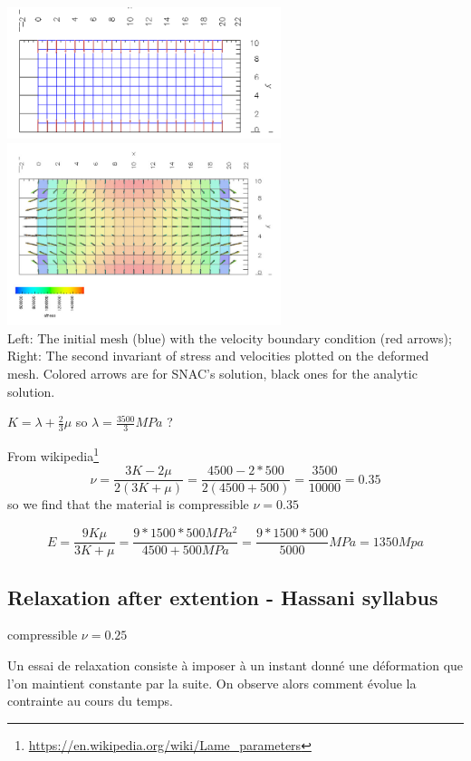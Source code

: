 \begin{center}
\includegraphics[width=8cm]{images/viscoelasticity/snac_5}
\includegraphics[width=8cm]{images/viscoelasticity/snac_6}\\
{\captionfont 
Left: The initial mesh (blue) with the velocity boundary condition (red arrows);
Right: The second invariant of stress and velocities plotted on the deformed mesh. Colored arrows are
for SNAC’s solution, black ones for the analytic solution.}
\end{center}

$K=\lambda + \frac23 \mu$ so $\lambda=\frac{3500}{3}MPa$ ?

From wikipedia\footnote{\url{https://en.wikipedia.org/wiki/Lame_parameters}}
\[
\nu = \frac{3K-2\mu}{2(3K+\mu)} 
= \frac{4500-2*500}{2(4500+500)}
= \frac{3500}{10000}
= 0.35
\]
so we find that the material is {\color{orange} compressible $\nu=0.35$}

\[
E=\frac{9K\mu}{3K+\mu} 
=\frac{9*1500*500 MPa^2}{4500+500 MPa}
=\frac{9*1500*500}{5000} MPa
= 1350Mpa
\]


\subsection{Relaxation after extention - Hassani syllabus}


{\color{orange} compressible $\nu=0.25$}

Un essai de relaxation consiste à imposer à un instant donné une déformation que 
l’on maintient constante par la suite. On observe alors comment évolue la contrainte au cours du temps.

